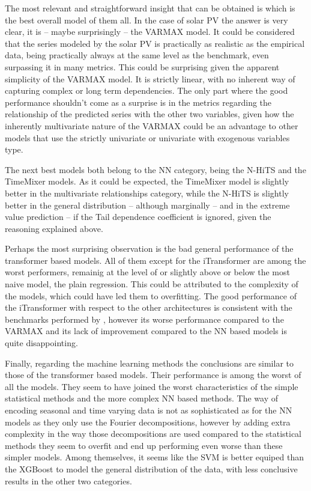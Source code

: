 The most relevant and straightforward insight that can be obtained is which is the best overall model of them all. In the case of solar PV the answer is very clear, it is -- maybe surprisingly -- the VARMAX model. It could be considered that the series modeled by the solar PV is practically as realistic as the empirical data, being practically always at the same level as the benchmark, even surpassing it in many metrics. This could be surprising given the apparent simplicity of the VARMAX model. It is strictly linear, with no inherent way of capturing complex or long term dependencies. The only part where the good performance shouldn't come as a surprise is in the metrics regarding the relationship of the predicted series with the other two variables, given how the inherently multivariate nature of the VARMAX could be an advantage to other models that use the strictly univariate or univariate with exogenous variables type. 

The next best models both belong to the NN category, being the N-HiTS and the TimeMixer models. As it could be expected, the TimeMixer model is slightly better in the multivariate relationships category, while the N-HiTS is slightly better in the general distribution -- although marginally -- and in the extreme value prediction -- if the Tail dependence coefficient is ignored, given the reasoning explained above. 

Perhaps the most surprising observation is the bad general performance of the transformer based models. All of them except for the iTransformer are among the worst performers, remainig at the level of or slightly above or below the most naive model, the plain regression. This could be attributed to the complexity of the models, which could have led them to overfitting. The good performance of the iTransformer with respect to the other architectures is consistent with the benchmarks performed by \cite{wang2024tssurvey}, however its worse performance compared to the VARMAX and its lack of improvement compared to the NN based models is quite disappointing. 

Finally, regarding the machine learning methods the conclusions are similar to those of the transformer based models. Their performance is among the worst of all the models. They seem to have joined the worst characteristics of the simple statistical methods and the more complex NN based methods. The way of encoding seasonal and time varying data is not as sophisticated as for the NN models as they only use the Fourier decompositions, however by adding extra complexity in the way those decompositions are used compared to the statistical methods they seem to overfit and end up performing even worse than these simpler models. Among themselves, it seems like the SVM is better equiped than the XGBoost to model the general distribution of the data, with less conclusive results in the other two categories.  

